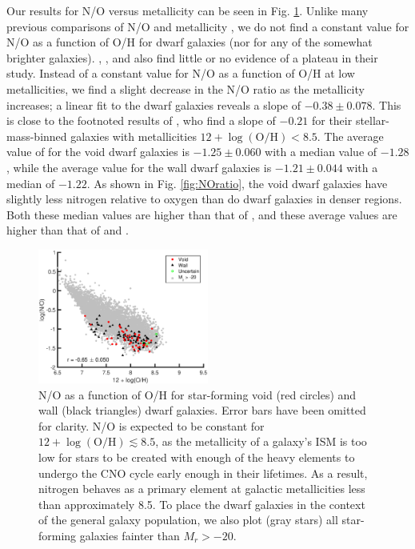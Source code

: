 Our results for N/O versus metallicity can be seen in Fig. \ref{fig:OvN}.  
Unlike many previous comparisons of N/O and metallicity 
\citep[for example,][]{VilaCostas93, Thuan95, Henry00, Pilyugin02, Lee04, 
Pilyugin04, Nava06, vanZee06a, PerezMontero09, Amorin10, Berg12}, we do not find 
a constant value for N/O as a function of O/H for dwarf galaxies (nor for any of 
the somewhat brighter galaxies).  \cite{Shields91}, \cite{Contini02}, and 
\cite{Nicholls14b} also find little or no evidence of a plateau in their study.  
Instead of a constant value for N/O as a function of O/H at low metallicities, 
we find a slight decrease in the N/O ratio as the metallicity increases; a 
linear fit to the dwarf galaxies reveals a slope of $-0.38\pm 0.078$.  This is 
close to the footnoted results of \cite{Andrews13}, who find a slope of $-0.21$ 
for their stellar-mass-binned galaxies with metallicities 
$12 + \log (\text{O}/\text{H}) < 8.5$.  The average value of \NO for the void 
dwarf galaxies is $-1.25\pm 0.060$ with a median value of $-1.28$, while the 
average value for the wall dwarf galaxies is $-1.21\pm 0.044$ with a median of 
$-1.22$.  As shown in Fig. \ref{fig:NOratio}, the void dwarf galaxies have 
slightly less nitrogen relative to oxygen than do dwarf galaxies in denser 
regions.  Both these median values are higher than that of \cite{Andrews13}, and 
these average values are higher than that of \cite{Izotov99} and \cite{Nava06}.  


\begin{figure}
    \includegraphics[width=0.5\textwidth]{Images/Paper2/1sig_I06_dwarf_0-20_SF_t3_Z12logOH_logNO}
    \caption[N/O versus metallicity of 135 dwarf galaxy sample]{N/O as a 
    function of O/H for star-forming void (red circles) and wall (black 
    triangles) dwarf galaxies.  Error bars have been omitted for clarity.  N/O 
    is expected to be constant for $12 + \log (\text{O}/\text{H}) \lesssim 8.5$, 
    as the metallicity of a galaxy's ISM is too low for stars to be created with 
    enough of the heavy elements to undergo the CNO cycle early enough in their 
    lifetimes.  As a result, nitrogen behaves as a primary element at galactic 
    metallicities less than approximately 8.5.  To place the dwarf galaxies in 
    the context of the general galaxy population, we also plot (gray stars) all 
    star-forming galaxies fainter than $M_r > -20$.}
    \label{fig:OvN}
\end{figure}

